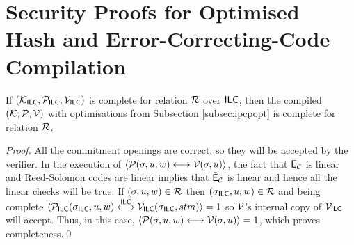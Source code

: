 
\appendix

\chapter{Security Proofs for Optimised Hash and Error-Correcting-Code Compilation}
\label{appendix:optproofs}

    \begin{theorem}[Completeness]
    If $(\mathcal{K}_{\mathsf{ILC}},\mathcal{P}_{\mathsf{ILC}},\mathcal{V}_{\mathsf{ILC}})$ is complete for relation $\mathcal{R}$ over $\mathsf{ILC}$, then the compiled $(\mathcal{K},\mathcal{P},\mathcal{V})$ with optimisations from Subsection \ref{subsec:ipcpopt} is complete for relation $\mathcal{R}$.
    \end{theorem}  
   \begin{proof}
All the commitment openings are correct, so they will be accepted by the verifier. In the execution of $\langle \mathcal{P}(\mathsf{\sigma},u,w)\longleftrightarrow\mathcal{V}(\mathsf{\sigma},u)\rangle$, the fact that $\mathsf{E}_{\mathcal{C}}$ is linear and Reed-Solomon codes are linear implies that $\tilde{\mathsf{E}}_{\mathcal{C}}$ is linear and hence all the linear checks will be true. If $(\mathsf{\sigma},u,w)\in \mathcal{R}$ then $(\mathsf{\sigma}_{\mathsf{ILC}},u,w)\in \mathcal{R}$ and being complete $\langle \mathcal{P}_{\mathsf{ILC}}(\mathsf{\sigma}_{\mathsf{ILC}},u,w)\overset{\mathsf{ILC}}{\longleftrightarrow}\mathcal{V}_{\mathsf{ILC}}(\mathsf{\sigma}_{\mathsf{ILC}},stm)\rangle =1$ so $\mathcal{V}$'s internal copy of $\mathcal{V}_{\mathsf{ILC}}$ will accept. Thus, in this case, $\langle \mathcal{P}(\mathsf{\sigma},u,w)\longleftrightarrow\mathcal{V}(\mathsf{\sigma},u)\rangle=1$, which proves completeness.\qed
    \end{proof}
  
